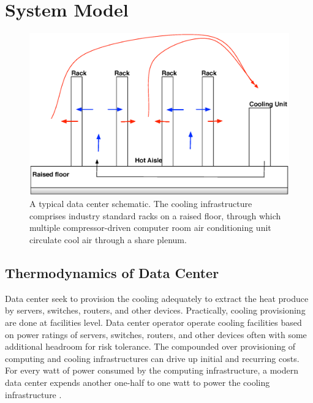 \documentclass[JIP]{ipsj}
\begin{document}
\section{System Model}\label{system model}

\begin{figure}[thb]
\begin{center}
\includegraphics[scale=0.3]{graphs/datacenter.eps}
\end{center}
\caption{A typical data center schematic.
The cooling infrastructure comprises industry standard racks on a raised floor, through which multiple compressor-driven computer room air conditioning unit circulate cool air through a share plenum.}
\label{fig:twotier}
\vspace{-2mm}
\end{figure} 


\subsection{Thermodynamics of Data Center}\label{thermodynamics}
Data center seek to provision the cooling adequately to extract the heat produce by servers, switches, routers, and other devices.
Practically, cooling provisioning are done at facilities level.
Data center operator operate cooling facilities based on power ratings of servers, switches, routers, and other devices often with some additional headroom for risk tolerance. 
The compounded over provisioning of computing and cooling infrastructures can drive up initial and recurring costs. 
For every watt of power consumed by the computing infrastructure, a modern data center expends another one-half to one watt to power the cooling infrastructure \cite{}.
\end{document}
